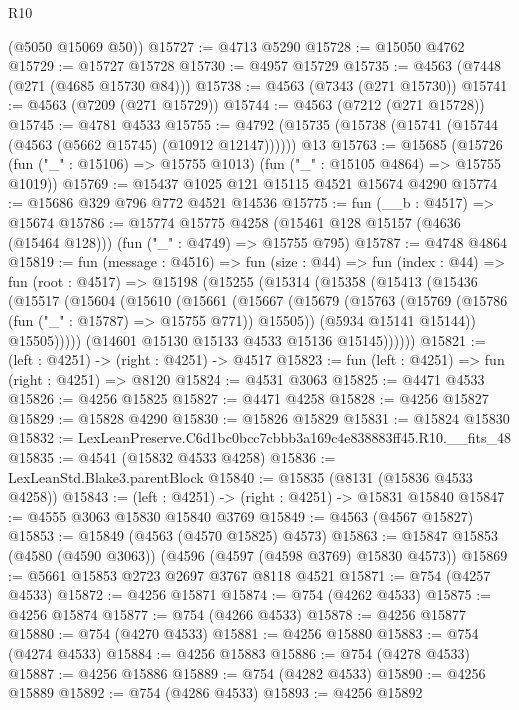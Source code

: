 \begin{lexlean}{R10}
\begin{coremodule}
      (@5050 @15069 @50))
@15727 := @4713 @5290
@15728 := @15050 @4762
@15729 := @15727 @15728
@15730 := @4957 @15729
@15735 := @4563 (@7448 (@271 (@4685 @15730 @84)))
@15738 := @4563 (@7343 (@271 @15730))
@15741 := @4563 (@7209 (@271 @15729))
@15744 := @4563 (@7212 (@271 @15728))
@15745 := @4781 @4533
@15755 := @4792 (@15735 (@15738 (@15741 (@15744 (@4563 (@5662 @15745) (@10912 @12147)))))) @13
@15763 := @15685
    (@15726 (fun ("_" : @15106) => @15755 @1013) (fun ("_" : @15105 @4864) => @15755 @1019))
@15769 := @15437 @1025 @121 @15115 @4521 @15674 @4290
@15774 := @15686 @329 @796 @772 @4521 @14536
@15775 := fun (__b : @4517) => @15674
@15786 := @15774
    @15775
    @4258
    (@15461 @128 @15157 (@4636 (@15464 @128)))
    (fun ("_" : @4749) => @15755 @795)
@15787 := @4748 @4864
@15819 := fun (message : @4516) =>
  fun (size : @44) =>
  fun (index : @44) =>
  fun (root : @4517) =>
  @15198
    (@15255
      (@15314
        (@15358
          (@15413
            (@15436
              (@15517
                (@15604
                  (@15610
                    (@15661
                      (@15667
                        (@15679
                          (@15763 (@15769 (@15786 (fun ("_" : @15787) => @15755 @771)) @15505))
                          (@5934 @15141 @15144))
                        @15505)))))
              (@14601 @15130 @15133 @4533 @15136 @15145))))))
@15821 := (left : @4251) -> (right : @4251) -> @4517
@15823 := fun (left : @4251) => fun (right : @4251) => @8120
@15824 := @4531 @3063
@15825 := @4471 @4533
@15826 := @4256 @15825
@15827 := @4471 @4258
@15828 := @4256 @15827
@15829 := @15828 @4290
@15830 := @15826 @15829
@15831 := @15824 @15830
@15832 := LexLeanPreserve.C6d1bc0bcc7cbbb3a169c4e838883ff45.R10.__fits_48
@15835 := @4541 (@15832 @4533 @4258)
@15836 := LexLeanStd.Blake3.parentBlock
@15840 := @15835 (@8131 (@15836 @4533 @4258))
@15843 := (left : @4251) -> (right : @4251) -> @15831 @15840
@15847 := @4555 @3063 @15830 @15840 @3769
@15849 := @4563 (@4567 @15827)
@15853 := @15849 (@4563 (@4570 @15825) @4573)
@15863 := @15847 @15853 (@4580 (@4590 @3063)) (@4596 (@4597 (@4598 @3769) @15830 @4573))
@15869 := @5661 @15853 @2723 @2697 @3767 @8118 @4521
@15871 := @754 (@4257 @4533)
@15872 := @4256 @15871
@15874 := @754 (@4262 @4533)
@15875 := @4256 @15874
@15877 := @754 (@4266 @4533)
@15878 := @4256 @15877
@15880 := @754 (@4270 @4533)
@15881 := @4256 @15880
@15883 := @754 (@4274 @4533)
@15884 := @4256 @15883
@15886 := @754 (@4278 @4533)
@15887 := @4256 @15886
@15889 := @754 (@4282 @4533)
@15890 := @4256 @15889
@15892 := @754 (@4286 @4533)
@15893 := @4256 @15892

\end{coremodule}
\end{lexlean}

